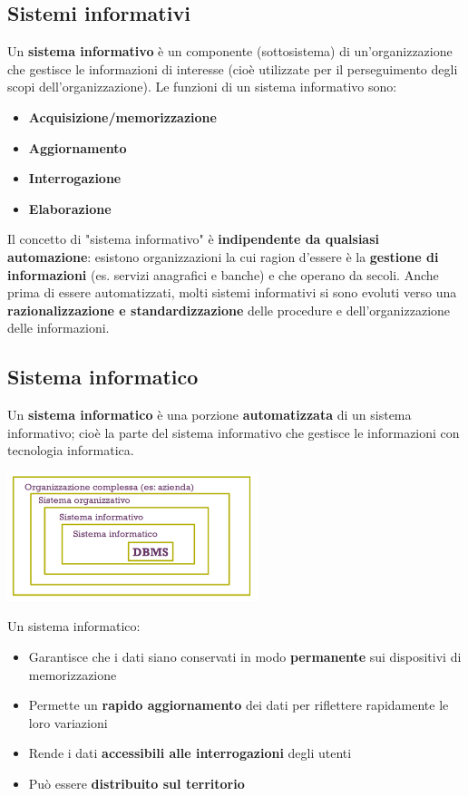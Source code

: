 \documentclass[12pt]{article}
\begin{document}
\subsection{Sistemi informativi}
Un \textbf{sistema informativo} è un componente (sottosistema) di un'organizzazione che gestisce le informazioni di interesse (cioè utilizzate per il perseguimento degli scopi dell'organizzazione).
Le funzioni di un sistema informativo sono:
\begin{itemize}
    \item \textbf{Acquisizione/memorizzazione}
    \item \textbf{Aggiornamento}
    \item \textbf{Interrogazione}
    \item \textbf{Elaborazione}
\end{itemize}
Il concetto di "sistema informativo" è \textbf{indipendente da qualsiasi automazione}: esistono organizzazioni
la cui ragion d'essere è la \textbf{gestione di informazioni} (es. servizi anagrafici e banche) e che operano da secoli.
Anche prima di essere automatizzati, molti sistemi informativi si sono evoluti verso una \textbf{razionalizzazione e standardizzazione} delle procedure e dell'organizzazione delle informazioni.
\subsection{Sistema informatico}
Un \textbf{sistema informatico} è una porzione \textbf{automatizzata} di un sistema informativo; cioè la parte del sistema informativo che gestisce le informazioni con tecnologia informatica.
\begin{center}
    \includegraphics[width = 0.55\textwidth]{Images/1.PNG}
\end{center}
\newpage
\noindent
Un sistema informatico:
\begin{itemize}
    \item Garantisce che i dati siano conservati in modo \textbf{permanente} sui dispositivi di memorizzazione
    \item Permette un \textbf{rapido aggiornamento} dei dati per riflettere rapidamente le loro variazioni
    \item Rende i dati \textbf{accessibili alle interrogazioni} degli utenti
    \item Può essere \textbf{distribuito sul territorio}
\end{itemize}
\end{document}
